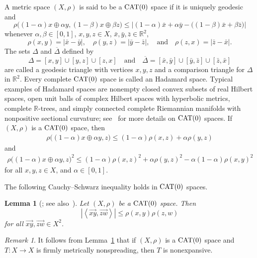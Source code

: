 \documentclass[draft]{amsart}
\numberwithin{equation}{section}
\def\R{\mathbb R}
\newcommand{\ip}[2]{\left\langle #1, #2 \right\rangle}
\providecommand{\abs}[1]{\left\lvert#1\right\rvert}
\newcommand{\CAT}{\textup{CAT}}
\theoremstyle{plain}
\newtheorem{lemma}[theorem]{Lemma}
\theoremstyle{definition}
\theoremstyle{remark}
\newtheorem{remark}[theorem]{Remark}
\begin{document}
A metric space $(X, \rho)$ is said to be a $\CAT(0)$ space 
if it is uniquely geodesic and 
\[
 \rho 
 \bigl(
 (1-\alpha)x\oplus \alpha y, 
 (1-\beta)x\oplus \beta z
 \bigr) 
 \leq 
 \abs{
 (1-\alpha)\bar{x}+ \alpha \bar{y} 
 - \bigl(
 (1-\beta)\bar{x}+ \beta \bar{z}
 \bigr)
 }
\]
whenever $\alpha, \beta\in [0,1]$, 
$x,y,z\in X$, $\bar{x}, \bar{y}, \bar{z}\in \R^2$, 
\[
 \rho(x,y) = \abs{\bar{x}-\bar{y}}, \quad 
 \rho(y,z) = \abs{\bar{y}-\bar{z}}, \quad 
 \textrm{and} \quad 
 \rho(z,x) = \abs{\bar{z}-\bar{x}}. 
\]
The sets $\Delta$ and $\overline{\Delta}$ defined by 
\[
 \Delta=[x,y]\cup[y,z]\cup[z,x] 
 \quad \textrm{and} \quad 
 \overline{\Delta}=[\bar{x},\bar{y}]\cup[\bar{y},\bar{z}]\cup[\bar{z},\bar{x}]
\]
are called a geodesic triangle with vertices $x,y,z$ and 
a comparison triangle for $\Delta$ in $\R^2$. 
Every complete $\CAT(0)$ space is called an Hadamard space. 
Typical examples of Hadamard spaces are 
nonempty closed convex subsets of real Hilbert spaces, 
open unit balls of complex Hilbert spaces with hyperbolic metrics, 
complete $\R$-trees, 
and simply connected complete Riemannian manifolds with 
nonpositive sectional curvature; 
see~\cites{MR3241330, MR1744486, MR1835418} for more details 
on $\CAT(0)$ spaces. 
If $(X, \rho)$ is a $\CAT(0)$ space, then 
\begin{align}\label{eq:conv-d-CAT0}
 \rho\bigl((1-\alpha)x\oplus \alpha y, z\bigr)
 \leq (1-\alpha) \rho(x, z) + \alpha \rho(y, z) 
\end{align}
and 
\begin{align}\label{eq:CN-CAT0}
 \rho\bigl((1-\alpha)x\oplus \alpha y, z\bigr)^2 
 \leq (1-\alpha) \rho(x, z)^2 + \alpha \rho(y, z)^2 
 -\alpha(1-\alpha)\rho(x,y)^2 
\end{align}
for all $x,y,z\in X$, and $\alpha \in [0,1]$. 

The following Cauchy--Schwarz inequality holds 
in $\CAT(0)$ spaces. 

\begin{lemma}[\cite{MR2390077}; see also~\cite{MR3241330}]
 \label{lem:CS-inequality}
 Let $(X, \rho)$ be a $\CAT(0)$ space. Then 
 \[
  \abs{\ip{\overrightarrow{xy}}{\overrightarrow{zw}}} 
  \leq \rho(x,y)\rho(z,w)
 \]
 for all $\overrightarrow{xy}, \overrightarrow{zw} \in X^2$. 
\end{lemma}

\begin{remark}\label{rem:fmn-fn}
It follows from Lemma~\ref{lem:CS-inequality} that 
if $(X, \rho)$ is a $\CAT(0)$ space and 
$T\colon X\to X$ is firmly metrically nonspreading, then $T$ is nonexpansive.  
\end{remark}
\end{document}
